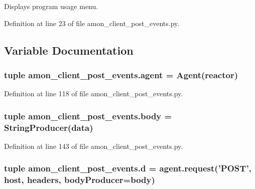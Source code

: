 Displays program usage menu. 



Definition at line 23 of file amon\-\_\-client\-\_\-post\-\_\-events.\-py.



\subsection{Variable Documentation}
\hypertarget{namespaceamon__client__post__events_a9a89e37f5a2f8e40f91be99a5bc5b500}{
\subsubsection[{agent}]{\setlength{\rightskip}{0pt plus 5cm}tuple amon\-\_\-client\-\_\-post\-\_\-events.\-agent = Agent(reactor)}}\label{namespaceamon__client__post__events_a9a89e37f5a2f8e40f91be99a5bc5b500}


Definition at line 118 of file amon\-\_\-client\-\_\-post\-\_\-events.\-py.

\hypertarget{namespaceamon__client__post__events_aeb700347754fd34b279e4d3349177203}{
\subsubsection[{body}]{\setlength{\rightskip}{0pt plus 5cm}tuple amon\-\_\-client\-\_\-post\-\_\-events.\-body = {\bf String\-Producer}({\bf data})}}\label{namespaceamon__client__post__events_aeb700347754fd34b279e4d3349177203}


Definition at line 143 of file amon\-\_\-client\-\_\-post\-\_\-events.\-py.

\hypertarget{namespaceamon__client__post__events_aaa19dceed6887d2592636a2f442429c2}{
\subsubsection[{d}]{\setlength{\rightskip}{0pt plus 5cm}tuple amon\-\_\-client\-\_\-post\-\_\-events.\-d = agent.\-request('P\-O\-S\-T', {\bf host}, {\bf headers}, body\-Producer={\bf body})}}\label{namespaceamon__client__post__events_aaa19dceed6887d2592636a2f442429c2}


